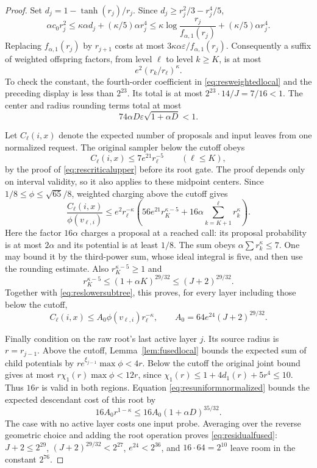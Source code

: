 \begin{proof}
Set $d_j=1-\tanh(r_j)/r_j$.
Since $d_j\ge r_j^2/3-r_j^4/5$,
\[
\alpha c_0r_j^2
\le\kappa\alpha d_j+(\kappa/5)\alpha r_j^4
\le\kappa\log\frac{r_j}{f_{\alpha,1}(r_j)}
       +(\kappa/5)\alpha r_j^4.
\]
Replacing $f_{\alpha,1}(r_j)$ by $r_{j+1}$ costs at most
$3\kappa\alpha\varepsilon/f_{\alpha,1}(r_j)$.
Consequently a suffix of weighted offspring factors, from level
$\ell$ to level $k\ge K$, is at most
\begin{equation}\label{eq:resweightedsuffix}
e^2(r_k/r_\ell)^\kappa.
\end{equation}
To check the constant, the fourth-order coefficient in
\eqref{eq:resweightedlocal} and the preceding display is less
than $2^{23}$. Its total is at most
$2^{23}\cdot14/J=7/16<1$.
The center and radius rounding terms total at most
\[
74\alpha D\varepsilon\sqrt{1+\alpha D}<1.
\]

Let $C_\ell(i,x)$ denote the expected number of proposals and
input leaves from one normalized request. The original sampler
below the cutoff obeys
\begin{equation}\label{eq:reslowersubtree}
C_\ell(i,x)\le7e^{21}r_\ell^{-5}\qquad(\ell\le K),
\end{equation}
by the proof of \eqref{eq:rescriticalupper} before its root gate.
The proof depends only on interval validity, so it also applies
to these midpoint centers.
Since $1/8\le\phi\le\sqrt{65}/8$, weighted charging above the
cutoff gives
\[
\frac{C_\ell(i,x)}{\phi(v_{\ell,i})}
\le e^2r_\ell^{-\kappa}
 \left(56e^{21}r_K^{\kappa-5}
       +16\alpha\sum_{k=K+1}^{\ell}r_k^\kappa\right).
\]
Here the factor $16\alpha$ charges a proposal at a reached call:
its proposal probability is at most $2\alpha$ and its potential
is at least $1/8$.
The sum obeys $\alpha\sum r_k^\kappa\le7$.
One may bound it by the third-power sum, whose ideal integral is
five, and then use the rounding estimate.
Also $r_K^{\kappa-5}\ge1$ and
\[
r_K^{\kappa-5}\le(1+\alpha K)^{29/32}
\le(J+2)^{29/32}.
\]
Together with \eqref{eq:reslowersubtree}, this proves, for every
layer including those below the cutoff,
\begin{equation}\label{eq:resuniformnormalized}
C_\ell(i,x)\le A_0\phi(v_{\ell,i})r_\ell^{-\kappa},
\qquad A_0=64e^{24}(J+2)^{29/32}.
\end{equation}

Finally condition on the raw root's last active layer $j$.
Its source radius is $r=r_{j-1}$.
Above the cutoff, Lemma~\ref{lem:fusedlocal} bounds the expected
sum of child potentials by
$r e^{\xi_{j-1}}\max\phi<4r$.
Below the cutoff the original joint bound gives at most
$r\chi_1(r)\max\phi<12r$, since
$\chi_1(r)\le1+4d_1(r)+5r^4\le10$.
Thus $16r$ is valid in both regions.
Equation \eqref{eq:resuniformnormalized} bounds the expected
descendant cost of this root by
\[
16 A_0 r^{1-\kappa}
\le16 A_0(1+\alpha D)^{35/32}.
\]
The case with no active layer costs one input probe.
Averaging over the reverse geometric choice and adding the root
operation proves \eqref{eq:residualfused}:
$J+2\le2^{29}$, $(J+2)^{29/32}<2^{27}$,
$e^{24}<2^{36}$, and $16\cdot64=2^{10}$ leave room in
the constant $2^{76}$.


\end{proof}
